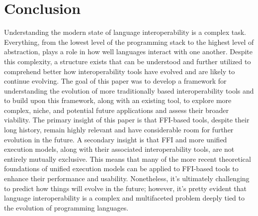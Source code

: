 \section{Conclusion}\label{s:conclusion}

Understanding the modern state of language interoperability is a complex task. Everything, from the lowest level of the programming stack to the highest level of abstraction, plays a role in how well languages interact with one another. Despite this complexity, a structure exists that can be understood and further utilized to comprehend better how interoperability tools have evolved and are likely to continue evolving. The goal of this paper was to develop a framework for understanding the evolution of more traditionally based interoperability tools and to build upon this framework, along with an existing tool, to explore more complex, niche, and potential future applications and assess their broader viability. The primary insight of this paper is that FFI-based tools, despite their long history, remain highly relevant and have considerable room for further evolution in the future. A secondary insight is that FFI and more unified execution models, along with their associated interoperability tools, are not entirely mutually exclusive. This means that many of the more recent theoretical foundations of unified execution models can be applied to FFI-based tools to enhance their performance and usability. Nonetheless, it's ultimately challenging to predict how things will evolve in the future; however, it's pretty evident that language interoperability is a complex and multifaceted problem deeply tied to the evolution of programming languages.   